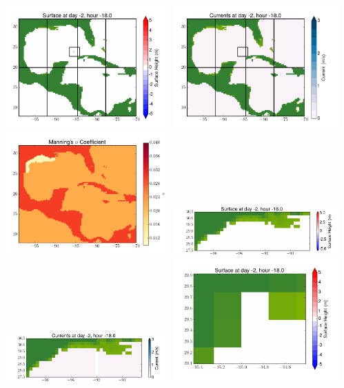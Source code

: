 \documentclass[11pt]{article}
\begin{document}
\vskip 10pt 
\includegraphics[width=0.475\textwidth]{frame0001fig1.png}
\includegraphics[width=0.475\textwidth]{frame0001fig2.png}
\vskip 10pt 
\includegraphics[width=0.475\textwidth]{frame0001fig3.png}
\includegraphics[width=0.475\textwidth]{frame0001fig4.png}
\vskip 10pt 
\includegraphics[width=0.475\textwidth]{frame0001fig5.png}
\includegraphics[width=0.475\textwidth]{frame0001fig6.png}
\end{document}
